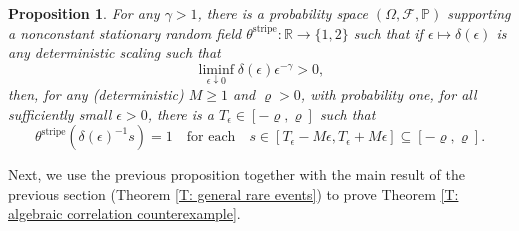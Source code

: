 \documentclass[10pt,a4paper]{amsart}
\newtheorem{prop}{Proposition}
\begin{document}
	\begin{prop} \label{P: random stripes} For any $\gamma > 1$, there is a probability space $(\Omega,\mathcal{F},\mathbb{P})$ supporting a nonconstant stationary random field $\theta^{\text{stripe}} : \mathbb{R} \to \{1,2\}$ such that if $\epsilon \mapsto \delta(\epsilon)$ is any deterministic scaling such that
		\begin{equation} \label{E: liminf condition}
			\liminf_{\epsilon \downarrow 0} \delta(\epsilon)\epsilon^{-\gamma} > 0,
		\end{equation}
	then, for any (deterministic) $M \geq 1$ and $\varrho > 0$, with probability one, for all sufficiently small $\epsilon > 0$, there is a $T_{\epsilon} \in [- \varrho, \varrho]$ such that 
		\begin{equation} \label{E: long correlations need this}
			\theta^{\text{stripe}}(\delta(\epsilon)^{-1}s) = 1 \quad \text{for each} \quad s \in [T_{\epsilon} - M \epsilon, T_{\epsilon} + M\epsilon] \subseteq [- \varrho,\varrho].
		\end{equation}
	\end{prop}

Next, we use the previous proposition together with the main result of the previous section (Theorem \ref{T: general rare events}) to prove Theorem \ref{T: algebraic correlation counterexample}.
\end{document}

